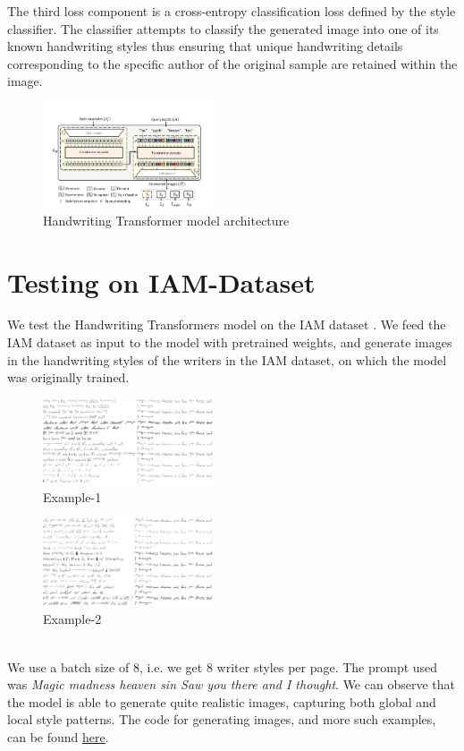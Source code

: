 \documentclass[10pt,twocolumn,letterpaper]{article}
\begin{document}
The third loss component is a cross-entropy classification loss defined by the style classifier. The classifier attempts to classify the generated image into one of its known handwriting styles thus ensuring that unique handwriting details corresponding to the specific author of the original sample are retained within the image.

\begin{figure}[!t]
  \centering
  \includegraphics[width=0.45\textwidth]{../latex-src/Images/Architecture.png}
  \caption{Handwriting Transformer model architecture}
  \label{fig:arch}
\end{figure}

\section{Testing on IAM-Dataset}
We test the Handwriting Transformers model on the IAM dataset \cite{IAM}. We feed the IAM dataset as input to the model with pretrained weights, and generate images in the handwriting styles of the writers in the IAM dataset, on which the model was originally trained. 
\begin{figure}[h]
  \centering
  \includegraphics[width=0.45\textwidth]{../latex-src/Images/IAM-test1.png}
  \caption{Example-1}
  \label{fig:IAM-test}
\end{figure}
\begin{figure}[h]
  \centering
  \includegraphics[width=0.45\textwidth]{../latex-src/Images/IAM-test2.png}
  \caption{Example-2}
  \label{fig:IAM-test2}
\end{figure} \\
We use a batch size of 8, i.e. we get 8 writer styles per page. The prompt used was \emph{Magic madness heaven sin Saw you there and I thought}. We can observe that the model is able to generate quite realistic images, capturing both global and local style patterns. The code for generating images, and more such examples, can be found \href{https://github.com/Shambu-K/handwriting-generator-model/blob/main/demo-hwt.ipynb}{here}.
\\
\end{document}
